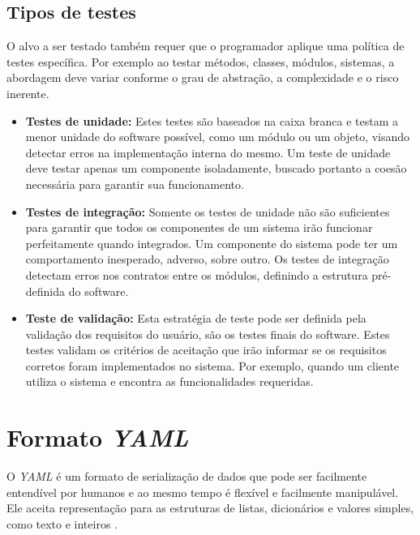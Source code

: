 \subsection{Tipos de testes}

O alvo a ser testado também requer que o programador aplique uma política de testes específica. Por exemplo ao testar métodos, classes, módulos, sistemas, a abordagem deve variar conforme o grau de abstração, a complexidade e o risco inerente.

\begin{itemize}
\item \textbf{Testes de unidade:} Estes testes são baseados na caixa branca e testam a menor unidade do software possível, como um módulo ou um objeto, visando detectar erros na implementação interna do mesmo. Um teste de unidade deve testar apenas um componente isoladamente, buscado portanto a coesão necessária para garantir sua funcionamento.
\end{itemize}

\begin{itemize}
\item \textbf{Testes de integração:} Somente os testes de unidade não são suficientes para garantir que todos os componentes de um sistema irão funcionar perfeitamente quando integrados. Um componente do sistema pode ter um comportamento inesperado, adverso, sobre outro. Os testes de integração detectam erros nos contratos entre os módulos, definindo a estrutura pré-definida do software.
\end{itemize}

\begin{itemize}
\item \textbf{Teste de validação:} Esta estratégia de teste pode ser definida pela validação dos requisitos do usuário, são os testes finais do software. Estes testes validam os critérios de aceitação que irão informar se os requisitos corretos foram implementados no sistema. Por exemplo, quando um cliente utiliza o sistema e encontra as funcionalidades requeridas.
\end{itemize}

\section{Formato \textit{YAML}}
\label{sec:yaml}

O \textit{YAML} é um formato de serialização de dados que pode ser facilmente entendível por humanos e ao mesmo tempo é flexível e facilmente manipulável. Ele aceita representação para as estruturas de listas, dicionários e valores simples, como texto e inteiros \cite{YAML}.

